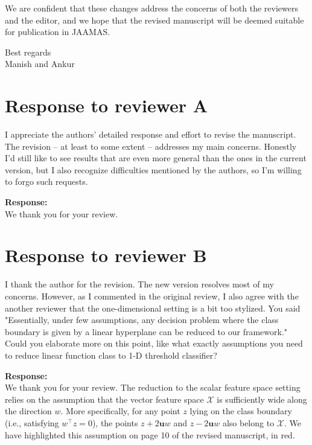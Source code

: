\documentclass[11pt]{article}
\newenvironment{response}
{\vspace{1ex}\begin{framed}
\noindent\textbf{Response:}\hspace{1em}\\[1ex]} {\end{framed}}
{\vspace{2ex}}
\def\br{\begin{response}}
\def\er{\end{response}}
\begin{document}
We are confident that these changes address the concerns of both the reviewers and the editor, and we hope that the revised manuscript will be deemed suitable for publication in JAAMAS.


\vspace{.5cm}
\noindent Best regards \\
\noindent Manish and Ankur\\
\newpage

\section{Response to reviewer A}
I appreciate the authors' detailed response and effort to revise the 
manuscript. The revision -- at least to some extent -- addresses my main 
concerns. Honestly I'd still like to see results that are even more general 
than the ones in the current version, but I also recognize difficulties 
mentioned by the authors, so I'm willing to forgo such requests.

    \br
    We thank you for your review.
    \er

 
\section{Response to reviewer B}
I thank the author for the revision. The new version resolves most of my 
concerns. However, as 
I commented in the original review, I also agree with the another 
reviewer that the one-dimensional setting is a bit too stylized. 
You said "Essentially, under few assumptions, any decision problem where 
the class boundary is given by a linear hyperplane can be reduced to our 
framework." Could you elaborate more on this point, like what exactly 
assumptions you need to reduce linear function class to 1-D threshold 
classifier?

\br
We thank you for your review. The reduction to the scalar feature space setting relies 
on the assumption that the vector feature space $\mathcal{X}$ is sufficiently wide along the 
direction $w$. More specifically, for any point $z$ lying on the class boundary 
(i.e., satisfying $w^\top z = 0$), the points $z + 2\mathbf{u} w$ and $z - 2\mathbf{u} w$ 
also belong to $\mathcal{X}$. We have highlighted this assumption on page 10 of the revised manuscript, in red.
\er
\end{document}
